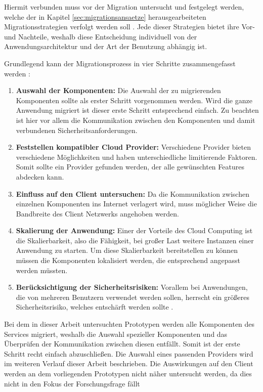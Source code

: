 Hiermit verbunden muss vor der Migration untersucht und festgelegt werden, welche der in Kapitel \ref{sec:migrationsansaetze} herausgearbeiteten Migrationsstrategien verfolgt werden soll \cite[Vgl.][10:38-13:23min]{AWS2019}. Jede dieser Strategien bietet ihre Vor- und Nachteile, weshalb diese Entscheidung individuell von der Anwendungsarchitektur und der Art der Benutzung abhängig ist.

Grundlegend kann der Migrationsprozess  in vier Schritte zusammengefasst werden \cite[Vgl. auch im Folgenden][S. 34ff]{Maenhaut2016}:
\begin{enumerate}
\item \textbf{Auswahl der Komponenten:} Die Auswahl der zu migrierenden Komponenten sollte als erster Schritt vorgenommen werden. Wird die ganze Anwendung migriert ist dieser erste Schritt entsprechend einfach. Zu beachten ist hier vor allem die Kommunikation zwischen den Komponenten und damit verbundenen Sicherheitsanforderungen.
\item \textbf{Feststellen kompatibler Cloud Provider:} Verschiedene Provider bieten verschiedene Möglichkeiten und haben unterschiedliche limitierende Faktoren. Somit sollte ein Provider gefunden werden, der alle gewünschten Features abdecken kann.
\item \textbf{Einfluss auf den Client untersuchen:} Da die Kommunikation zwischen einzelnen Komponenten ins Internet verlagert wird, muss möglicher Weise die Bandbreite des Client Netzwerks angehoben werden.
\item \textbf{Skalierung der Anwendung:} Einer der Vorteile des Cloud Computing ist die Skalierbarkeit, also die Fähigkeit, bei großer Last weitere Instanzen einer Anwendung zu starten. Um diese Skalierbarkeit bereitstellen zu können müssen die Komponenten lokalisiert werden, die entsprechend angepasst werden müssten.
\item \textbf{Berücksichtigung der Sicherheitsrisiken:} Vorallem bei Anwendungen, die von mehreren Benutzern verwendet werden sollen, herrscht ein größeres Sicherheitsrisiko, welches entschärft werden sollte \cite[Vgl.][S. 38]{Maenhaut2016}.
\end{enumerate}


Bei dem in dieser Arbeit untersuchten Prototypen werden alle Komponenten des Services migriert, weshalb die Auswahl spezieller Komponenten und das Überprüfen der Kommunikation zwischen diesen entfällt. Somit ist der erste Schritt recht einfach abzuschließen. Die Auswahl eines passenden Providers wird im weiteren Verlauf dieser Arbeit beschrieben. Die Auswirkungen auf den Client werden an dem vorliegenden Prototypen nicht näher untersucht werden, da dies nicht in den Fokus der Forschungsfrage fällt \pagebreak

